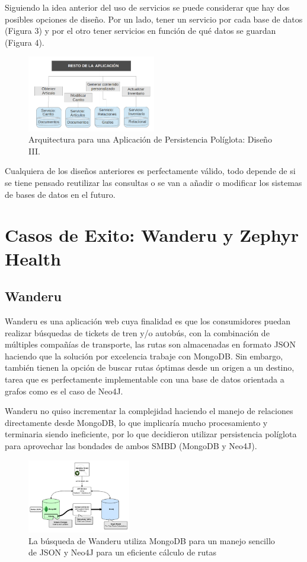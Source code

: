 \documentclass[conference]{IEEEtran}
\begin{document}
Siguiendo la idea anterior del uso de servicios se puede considerar que hay dos posibles opciones de diseño. Por un lado, tener un servicio por cada base de datos (Figura 3) y por el otro tener servicios en funci\'on de qu\'e datos se guardan (Figura 4).

\begin{figure}[!h]
\centering
\includegraphics[width=0.5\textwidth]{4}
\caption{Arquitectura para una Aplicaci\'on de Persistencia Pol\'iglota: Diseño III.}
\label{fig4}
\end{figure}
Cualquiera de los diseños anteriores es perfectamente v\'alido, todo depende de si se tiene pensado reutilizar las consultas o se van a añadir o modificar los sistemas de bases de datos en el futuro.

\section{Casos de Exito: Wanderu y Zephyr Health}
\subsection{Wanderu}
Wanderu es una aplicaci\'on web cuya finalidad es que los consumidores puedan realizar b\'usquedas de tickets de tren y/o autob\'us, con la combinaci\'on de múltiples compañías de transporte, las rutas son almacenadas en formato JSON haciendo que la soluci\'on por excelencia trabaje con MongoDB. Sin embargo, tambi\'en tienen la opción de buscar rutas \'optimas desde un origen a un destino, tarea que es perfectamente implementable con una base de datos orientada a grafos como es el caso de Neo4J.\cite{wanderu}

Wanderu no quiso incrementar la complejidad haciendo el manejo de relaciones directamente desde MongoDB, lo que implicar\'ia mucho procesamiento y terminaria siendo ineficiente, por lo que decidieron utilizar persistencia pol\'iglota para aprovechar las bondades de ambos SMBD (MongoDB y Neo4J).

\begin{figure}[!h]
\centering
\includegraphics[width=0.4\textwidth]{wanderu}
\caption{La b\'usqueda de Wanderu utiliza MongoDB para un manejo sencillo de JSON y Neo4J para un eficiente c\'alculo de rutas}
\label{fig10}
\end{figure}
\end{document}

